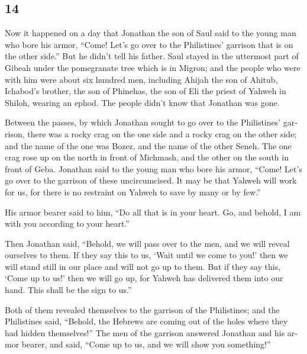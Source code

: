 \begin{paracol}{2}
\switchcolumn
\begin{otherlanguage}{english}

\hypertarget{section-27}{%
\section{14}\label{section-27}}

 Now it happened on a day that Jonathan the son of Saul
said to the young man who bore his armor, ``Come! Let's go over to the
Philistines' garrison that is on the other side.'' But he didn't tell
his father.  Saul stayed in the uttermost part of Gibeah
under the pomegranate tree which is in Migron; and the people who were
with him were about six hundred men,  including Ahijah the
son of Ahitub, Ichabod's brother, the son of Phinehas, the son of Eli
the priest of Yahweh in Shiloh, wearing an ephod. The people didn't know
that Jonathan was gone.

 Between the passes, by which Jonathan sought to go over
to the Philistines' garrison, there was a rocky crag on the one side and
a rocky crag on the other side; and the name of the one was Bozez, and
the name of the other Seneh.  The one crag rose up on the
north in front of Michmash, and the other on the south in front of Geba.
 Jonathan said to the young man who bore his armor,
``Come! Let's go over to the garrison of these uncircumcised. It may be
that Yahweh will work for us, for there is no restraint on Yahweh to
save by many or by few.''

 His armor bearer said to him, ``Do all that is in your
heart. Go, and behold, I am with you according to your heart.''

 Then Jonathan said, ``Behold, we will pass over to the
men, and we will reveal ourselves to them.  If they say
this to us, `Wait until we come to you!' then we will stand still in our
place and will not go up to them.  But if they say this,
`Come up to us!' then we will go up, for Yahweh has delivered them into
our hand. This shall be the sign to us.''

 Both of them revealed themselves to the garrison of the
Philistines; and the Philistines said, ``Behold, the Hebrews are coming
out of the holes where they had hidden themselves!''  The
men of the garrison answered Jonathan and his armor bearer, and said,
``Come up to us, and we will show you something!''


\end{otherlanguage}
\end{paracol}
